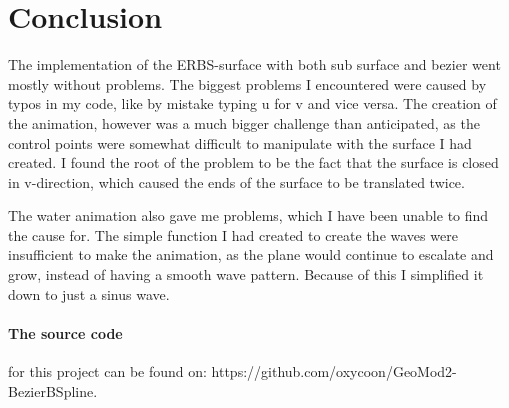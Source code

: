 \documentclass[a4paper,11pt]{article}
\begin{document}
\section{Conclusion}
The implementation of the ERBS-surface with both sub surface and bezier went mostly without problems. The biggest problems I encountered were caused by typos in my code, like by mistake typing u for v and vice versa. The creation of the animation, however was a much bigger challenge than anticipated, 
as the control points were somewhat difficult to manipulate with the surface I had created. I found the root of the problem to be the fact that the surface is closed in v-direction, which caused the ends of the surface to be translated twice. 

The water animation also gave me problems, which I have been unable to find the cause for. The simple function I had created to create the waves were insufficient to make the animation, as the plane would continue
to escalate and grow, instead of having a smooth wave pattern. Because of this I simplified it down to just a sinus wave. 

\paragraph{The source code}
for this project can be found on: https://github.com/oxycoon/GeoMod2-BezierBSpline.



\end{document}
